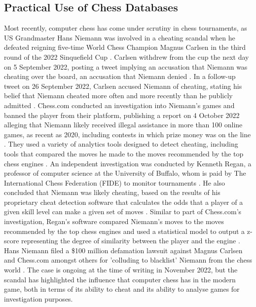 \documentclass[%
 superscriptaddress,
showpacs,preprintnumbers,
 amsmath,
 amssymb,
 aps,
 pra,
showkeys,
onecolumn,
notitlepage,
11pt,
tightenlines      %
]{revtex4-1}
\begin{document}
\subsection{Practical Use of Chess Databases}
Most recently, computer chess has come under scrutiny in chess tournaments, as US Grandmaster Hans Niemann was involved in a cheating scandal when he defeated reigning five-time World Chess Champion Magnus Carlsen in the third round of the 2022 Sinquefield Cup \cite{niemannDefeatsCarlsen}. Carlsen withdrew from the cup the next day on 5 September 2022, posting a tweet implying an accusation that Niemann was cheating over the board, an accusation that Niemann denied \cite{niemannCheatingAllegations}. In a follow-up tweet on 26 September 2022, Carlsen accused Niemann of cheating, stating his belief that Niemann cheated more often and more recently than he publicly admitted \cite{niemannCheatingAllegations2}. Chess.com conducted an investigation into Niemann's games and banned the player from their platform, publishing a report on 4 October 2022 alleging that Niemann likely received illegal assistance in more than 100 online games, as recent as 2020, including contests in which prize money was on the line \cite{niemannCheatingChessComReport}. They used a variety of analytics tools designed to detect cheating, including tools that compared the moves he made to the moves recommended by the top chess engines \cite{niemannCheatingChessComReport}. An independent investigation was conducted by Kenneth Regan, a professor of computer science at the University of Buffalo, whom is paid by The International Chess Federation (FIDE) to monitor tournaments \cite{niemannCheatingReganReport}. He also concluded that Niemann was likely cheating, based on the results of his proprietary cheat detection software that calculates the odds that a player of a given skill level can make a given set of moves \cite{niemannCheatingReganReport}. Similar to part of Chess.com's investigation, Regan's software compared Niemann's moves to the moves recommended by the top chess engines and used a statistical model to output a z-score representing the degree of similarity between the player and the engine \cite{niemannCheatingReganReport}. Hans Niemann filed a \$100 million defamation lawsuit against Magnus Carlsen and Chess.com amongst others for 'colluding to blacklist' Niemann from the chess world \cite{niemannCheatingDefamationLawsuit}. The case is ongoing at the time of writing in November 2022, but the scandal has highlighted the influence that computer chess has in the modern game, both in terms of its ability to cheat and its ability to analyse games for investigation purposes.
\end{document}
